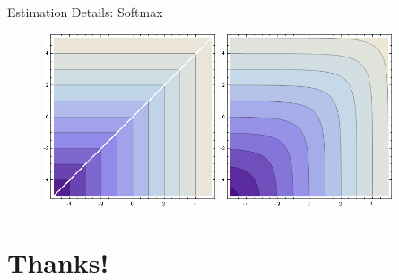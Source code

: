 \begin{frame}{Estimation Details: Softmax}
\begin{figure}[htbp]
\begin{center}
\includegraphics[width=2in]{./resources_1/hardmax.png}
\includegraphics[width=2in]{./resources_1/softmax.png}
\end{center}
\end{figure}
\end{frame}


\section{Thanks!}



